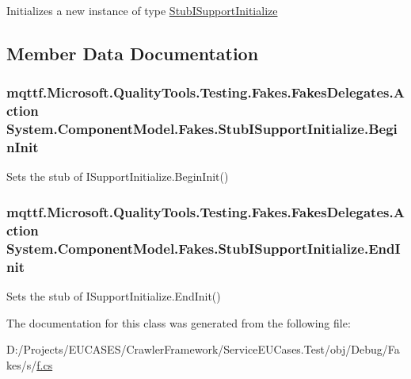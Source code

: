Initializes a new instance of type \hyperlink{class_system_1_1_component_model_1_1_fakes_1_1_stub_i_support_initialize}{Stub\-I\-Support\-Initialize}



\subsection{Member Data Documentation}
\hypertarget{class_system_1_1_component_model_1_1_fakes_1_1_stub_i_support_initialize_a5dd02e04c8006921a66ea606588d257d}{
\subsubsection[{Begin\-Init}]{\setlength{\rightskip}{0pt plus 5cm}mqttf.\-Microsoft.\-Quality\-Tools.\-Testing.\-Fakes.\-Fakes\-Delegates.\-Action System.\-Component\-Model.\-Fakes.\-Stub\-I\-Support\-Initialize.\-Begin\-Init}}\label{class_system_1_1_component_model_1_1_fakes_1_1_stub_i_support_initialize_a5dd02e04c8006921a66ea606588d257d}


Sets the stub of I\-Support\-Initialize.\-Begin\-Init()

\hypertarget{class_system_1_1_component_model_1_1_fakes_1_1_stub_i_support_initialize_a6148c34e0517993fed02ba5d39dc2190}{
\subsubsection[{End\-Init}]{\setlength{\rightskip}{0pt plus 5cm}mqttf.\-Microsoft.\-Quality\-Tools.\-Testing.\-Fakes.\-Fakes\-Delegates.\-Action System.\-Component\-Model.\-Fakes.\-Stub\-I\-Support\-Initialize.\-End\-Init}}\label{class_system_1_1_component_model_1_1_fakes_1_1_stub_i_support_initialize_a6148c34e0517993fed02ba5d39dc2190}


Sets the stub of I\-Support\-Initialize.\-End\-Init()



The documentation for this class was generated from the following file\-:\begin{DoxyCompactItemize}
\item 
D\-:/\-Projects/\-E\-U\-C\-A\-S\-E\-S/\-Crawler\-Framework/\-Service\-E\-U\-Cases.\-Test/obj/\-Debug/\-Fakes/s/\hyperlink{s_2f_8cs}{f.\-cs}\end{DoxyCompactItemize}
